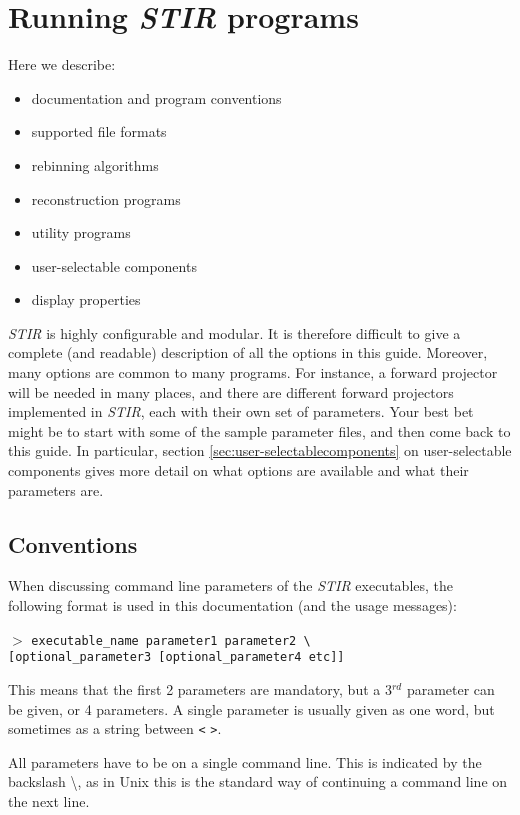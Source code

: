\documentclass{article}
\newcommand{\cmdline}[1]{\par \noindent $>$ \texttt{#1}\par}
\begin{document}
\section{
Running \textit{STIR} programs}

Here we describe:
\begin{itemize}
\item documentation and program conventions
\item supported file formats 
\item rebinning algorithms
\item reconstruction programs
\item utility programs
\item user-selectable components
\item display properties
\end{itemize}

\textit{STIR} is highly configurable and modular. It is therefore difficult to give a complete (and readable)
description of all the options in this guide. Moreover, many options are common to many
programs. For instance, a forward projector will be needed in many places, and there are 
different forward projectors implemented in \textit{STIR}, each with their own set of 
parameters. Your best bet might be to start with some of the sample parameter files, and then
come back to this guide. In particular, section \ref{sec:user-selectablecomponents}
on user-selectable components gives more detail on what options are available
and what their parameters are.

\subsection{
Conventions}
\label{sec:conventions}
When discussing command line parameters of the \textit{STIR} executables, 
the following format is used in this documentation (and the usage messages):
\cmdline{executable\_name parameter1 parameter2 {\textbackslash}\\
{[}optional\_parameter3 [optional\_parameter4 etc]]}


This means that the first 2 parameters are mandatory, but a 3$^{rd}$ 
parameter can be given, or 4 parameters. A single parameter is 
usually given as one word, but sometimes as a string between 
\texttt{<} \texttt{>}. 


All parameters have to be on a single command line. This is indicated 
by the backslash {\textbackslash}, as in Unix this is the standard way 
of continuing a command line on the next line.
\end{document}

